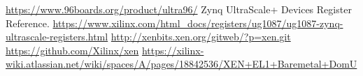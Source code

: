 \documentclass[spanish,12pt,a4paper,oneside]{book}
\begin{document}
\begin{thebibliography}{00}
   \url{https://www.96boards.org/product/ultra96/}
   Zynq UltraScale+ Devices Register Reference. \url{https://www.xilinx.com/html_docs/registers/ug1087/ug1087-zynq-ultrascale-registers.html}
   \url{http://xenbits.xen.org/gitweb/?p=xen.git}
   \url{https://github.com/Xilinx/xen}
   \url{https://xilinx-wiki.atlassian.net/wiki/spaces/A/pages/18842536/XEN+EL1+Baremetal+DomU}
\end{thebibliography}
\end{document}
